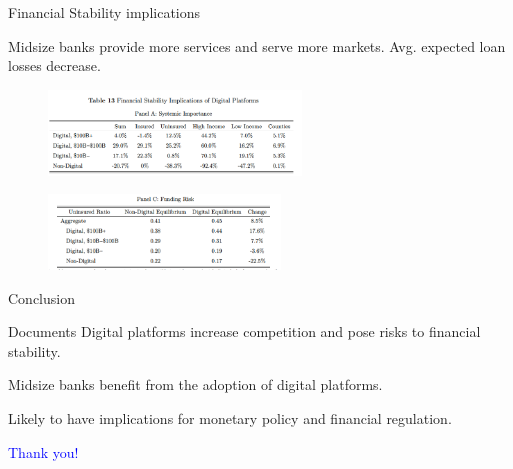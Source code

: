 \documentclass[notes,10pt, aspectratio=169]{beamer}
\newenvironment{wideitemize}{\itemize\addtolength{\itemsep}{10pt}}{\enditemize}
\begin{document}
            \begin{frame}{Financial Stability implications}\label{fin_stab}

 Midsize banks provide more services and serve more markets. Avg. expected loan losses decrease.
                \begin{figure}
                    \centering
                    \includegraphics[width=0.6\textwidth]{imgs/tab13.png}
                \end{figure}
                
                \begin{figure}
                    \centering
                    \includegraphics[width=0.55\textwidth]{imgs/tab13c.png}
                \end{figure}
            \end{frame}

     







\begin{frame}{Conclusion}
        \begin{wideitemize}

            \item Documents Digital platforms increase competition and pose risks to financial stability. 
            \item Midsize banks benefit from the adoption of digital platforms.
            \item Likely to have implications for monetary policy and financial regulation.
        \end{wideitemize}

    \end{frame}
    

    \begin{frame}{}
        \centering
        \huge \textcolor{blue}{Thank you!}
    \end{frame}


    
\end{document}
